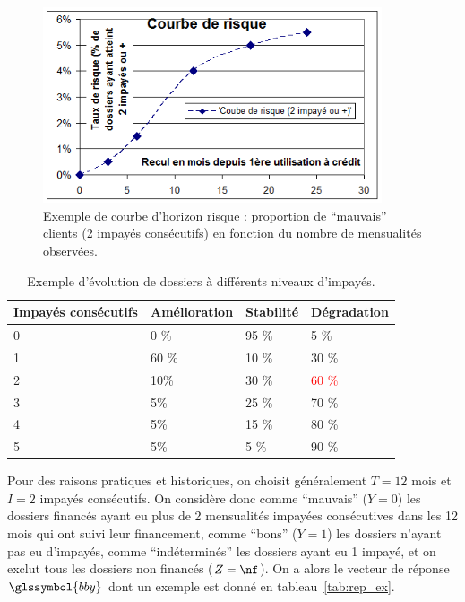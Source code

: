\begin{figure}
\centering
\includegraphics[width=10cm]{figures/chapitre1/courbe_risque.png}
\caption{\label{fig:courbe_horizon} Exemple de courbe d'horizon risque : proportion de ``mauvais'' clients (2 impayés consécutifs) en fonction du nombre de mensualités observées.}
\end{figure}

\begin{table}
\centering
\caption{\label{tab:impayes} Exemple d'évolution de dossiers à différents niveaux d'impayés.} 
\begin{tabular}{l|l|l|l}
Impayés consécutifs & Amélioration & Stabilité & Dégradation \\
\hline
0 & 0 \% & 95 \% & 5 \%  \\
1 & 60 \% & 10 \% & 30 \%  \\
2 & 10\% & 30 \% & \textcolor{red}{60 \%} \\
3 & 5\% & 25 \% & {70 \%} \\
4 & 5\% & 15 \% & {80 \%} \\
5 & 5\% & 5 \% & {90 \%} \\
\end{tabular}
\end{table}




Pour des raisons pratiques et historiques, on choisit généralement $T=12$ mois et $I = 2$ impayés consécutifs. On considère donc comme ``mauvais'' ($Y=0$) les dossiers financés ayant eu plus de 2 mensualités impayées consécutives dans les 12 mois qui ont suivi leur financement, comme ``bons'' ($Y=1$) les dossiers n'ayant pas eu d'impayés, comme ``indéterminés'' les dossiers ayant eu 1 impayé, et on exclut tous les dossiers non financés ($Z=\nf$). On a alors le vecteur de réponse $\glssymbol{bby}$ dont un exemple est donné en tableau~\ref{tab:rep_ex}.

